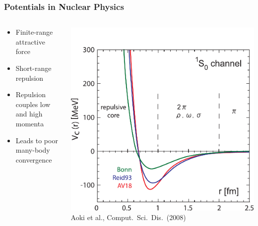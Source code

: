 \documentclass[accentcolor=tud2c,usenames,dvipsnames,colorbacktitle,inverttitle,landscape,german,presentation,t]{tudbeamer}
\begin{document}
  \begin{frame}
    \frametitle{Potentials in Nuclear Physics}
    \begin{columns}[c]
      \begin{column}{0.6\textwidth}
        \begin{itemize}
          \item Finite-range attractive force
          \item Short-range repulsion
          \item Repulsion couples low and high momenta
          \item Leads to poor many-body convergence
        \end{itemize}
      \end{column}
      \begin{column}{0.4\textwidth}
        \begin{center}
          \includegraphics[width=\textwidth]{figures/02/hatsuda_phen-pot_new}
          \\ \footnotesize{Aoki et al., Comput.~Sci.~Dis.~(2008)}
        \end{center}
      \end{column}
    \end{columns}
  \end{frame}
\end{document}
